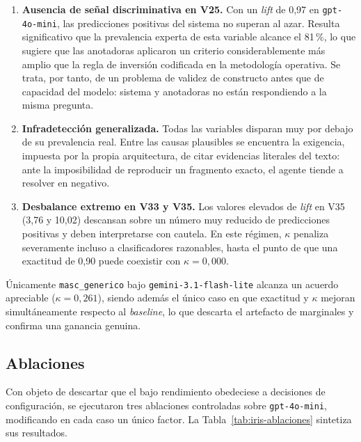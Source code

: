 \begin{enumerate}
    \item \textbf{Ausencia de señal discriminativa en V25.} Con un \textit{lift}
    de 0,97 en \texttt{gpt-4o-mini}, las predicciones positivas del sistema no
    superan al azar. Resulta significativo que la prevalencia experta de esta
    variable alcance el 81\,\%, lo que sugiere que las anotadoras aplicaron un
    criterio considerablemente más amplio que la regla de inversión codificada
    en la metodología operativa. Se trata, por tanto, de un problema de validez
    de constructo antes que de capacidad del modelo: sistema y anotadoras no
    están respondiendo a la misma pregunta.

    \item \textbf{Infradetección generalizada.} Todas las variables disparan muy
    por debajo de su prevalencia real. Entre las causas plausibles se encuentra
    la exigencia, impuesta por la propia arquitectura, de citar evidencias
    literales del texto: ante la imposibilidad de reproducir un fragmento exacto,
    el agente tiende a resolver en negativo.

    \item \textbf{Desbalance extremo en V33 y V35.} Los valores elevados de
    \textit{lift} en V35 (3,76 y 10,02) descansan sobre un número muy reducido de
    predicciones positivas y deben interpretarse con cautela. En este régimen,
    $\kappa$ penaliza severamente incluso a clasificadores razonables, hasta el
    punto de que una exactitud de 0,90 puede coexistir con $\kappa = 0,000$.
\end{enumerate}

Únicamente \texttt{masc\_generico} bajo \texttt{gemini-3.1-flash-lite} alcanza
un acuerdo apreciable ($\kappa = 0,261$), siendo además el único caso en que
exactitud y $\kappa$ mejoran simultáneamente respecto al \textit{baseline}, lo
que descarta el artefacto de marginales y confirma una ganancia genuina.

\subsection{Ablaciones}
\label{subsec:iris_ablaciones}

Con objeto de descartar que el bajo rendimiento obedeciese a decisiones de
configuración, se ejecutaron tres ablaciones controladas sobre
\texttt{gpt-4o-mini}, modificando en cada caso un único factor. La
Tabla~\ref{tab:iris-ablaciones} sintetiza sus resultados.

